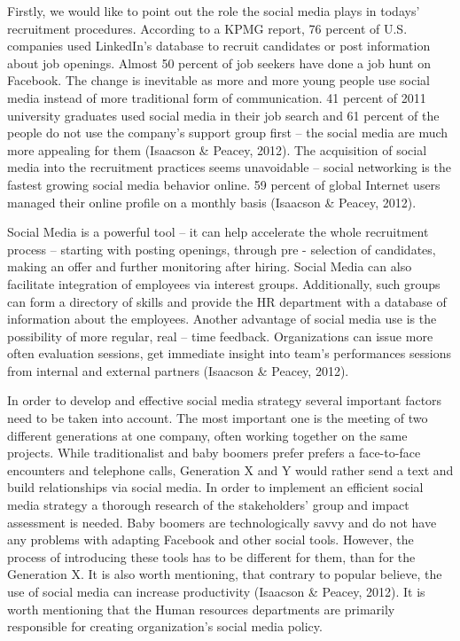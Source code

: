 \documentclass[a4paper,fleqn,11pt,dvips,titlepage]{article}
\numberwithin{figure}{section}
\numberwithin{equation}{section}
\begin{document}
Firstly, we would like to point out the role the social media plays in todays’ recruitment procedures. According to a KPMG report, 76 percent of U.S. companies used LinkedIn’s database to recruit candidates or post information about job openings. Almost 50 percent of job seekers have done a job hunt on Facebook. The change is inevitable as more and more young people use social media instead of more traditional form of communication. 41 percent of 2011 university graduates used social media in their job search and 61 percent of the people do not use the company’s support group first – the social media are much more appealing for them (Isaacson & Peacey, 2012). The acquisition of social media into the recruitment practices seems unavoidable – social networking is the fastest growing social media behavior online. 59 percent of global Internet users managed their online profile on a monthly basis (Isaacson & Peacey, 2012). 

Social Media is a powerful tool – it can help accelerate the whole recruitment process – starting with posting openings, through pre - selection of candidates, making an offer and further monitoring after hiring. Social Media can also facilitate integration of employees via interest groups. Additionally, such groups can form a directory of skills and provide the HR department with a database of information about the employees. 
Another advantage of social media use is the possibility of more regular, real – time feedback. Organizations can issue more often evaluation sessions, get immediate insight into team’s performances sessions from internal and external partners (Isaacson & Peacey, 2012). 

In order to develop and effective social media strategy several important factors need to be taken into account. The most important one is the meeting of two different generations at one company, often working together on the same projects. While traditionalist and baby boomers prefer prefers a face-to-face encounters and telephone calls, Generation X and Y would rather send a text and build relationships via social media. In order to implement an efficient social media strategy a thorough research of the stakeholders’ group and impact assessment is needed. Baby boomers are technologically savvy and do not have any problems with adapting Facebook and other social tools. However, the process of introducing these tools has to be different for them, than for the Generation X. It is also worth mentioning, that contrary to popular believe, the use of social media can increase productivity (Isaacson & Peacey, 2012). It is worth mentioning that the Human resources departments are primarily responsible for creating organization’s social media policy. 
\end{document}

